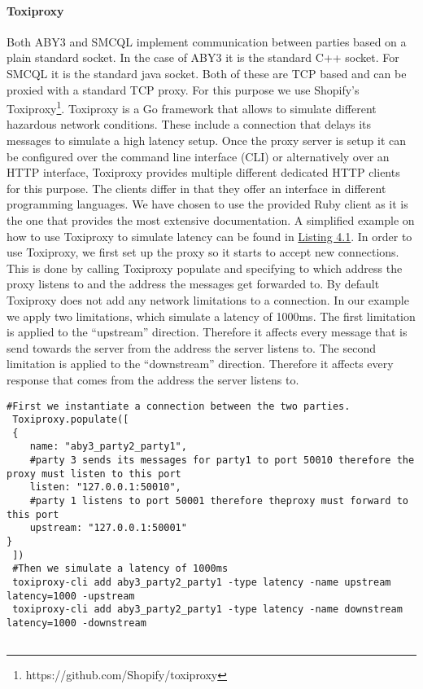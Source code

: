  \paragraph{Toxiproxy}
 Both ABY3 and SMCQL implement communication between parties based on a plain standard socket. In the case of ABY3 it is the standard C++ socket. For SMCQL it is the standard java socket. Both of these are TCP based and can be proxied with a standard TCP proxy. For this purpose we use Shopify's Toxiproxy\footnote{https://github.com/Shopify/toxiproxy}. Toxiproxy is a Go framework that allows to simulate different hazardous network conditions. These include a connection that delays its messages to simulate a high latency setup. Once the proxy server is setup it can be configured over the command line interface (CLI) or alternatively over an HTTP interface, Toxiproxy provides multiple different dedicated HTTP clients for this purpose. The clients differ in that they offer an interface in different programming languages. We have chosen to use the provided Ruby client as it is the one that provides the most extensive documentation. 
 A simplified example on how to use Toxiproxy to simulate latency can be found in \hyperref[Toxi_label]{Listing 4.1}. In order to use Toxiproxy, we first set up the proxy so it starts to accept new connections. This is done by calling Toxiproxy populate and specifying to which address the proxy listens to and the address the messages get forwarded to.
 By default Toxiproxy does not add any network limitations to a connection. In our example we apply two limitations, which simulate a latency of 1000ms. The first limitation is applied to the ``upstream'' direction. Therefore it affects every message that is send towards the server from the address the server listens to. The second limitation is applied to the ``downstream'' direction. Therefore it affects every response that comes from the address the server listens to.    \newpage
 
 
 
 \label{Toxi_label}				
 \begin{lstlisting}[caption={Setting up a proxy that simulates latency between two parties with Toxiporxy}]
 #First we instantiate a connection between the two parties. 
 Toxiproxy.populate([
 {
 	name: "aby3_party2_party1",
 	#party 3 sends its messages for party1 to port 50010 therefore the proxy must listen to this port
 	listen: "127.0.0.1:50010",   
 	#party 1 listens to port 50001 therefore theproxy must forward to this port
 	upstream: "127.0.0.1:50001"  
}
 ])
 #Then we simulate a latency of 1000ms 
 toxiproxy-cli add aby3_party2_party1 -type latency -name upstream latency=1000 -upstream
 toxiproxy-cli add aby3_party2_party1 -type latency -name downstream latency=1000 -downstream
 
 \end{lstlisting}

